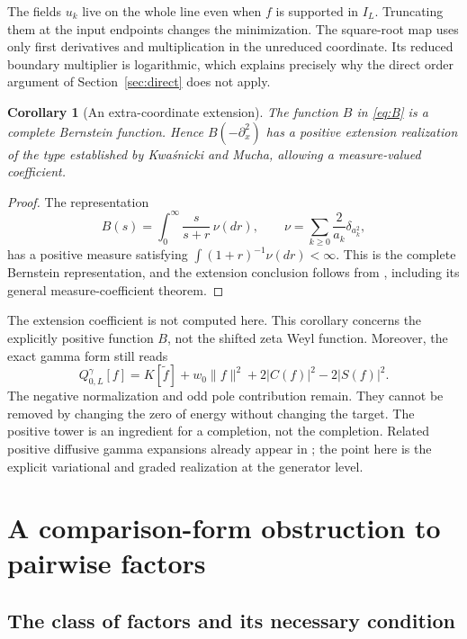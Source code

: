\documentclass[11pt]{article}
\numberwithin{equation}{section}
\newtheorem{corollary}[theorem]{Corollary}
\theoremstyle{definition}
\theoremstyle{remark}
\newcommand{\norm}[1]{\lVert#1\rVert}
\newcommand{\Qgam}{Q^{\gamma}}
\begin{document}
The fields $u_k$ live on the whole line even when $f$ is supported in
$I_L$. Truncating them at the input endpoints changes the minimization.
The square-root map uses only first derivatives and multiplication in the
unreduced coordinate. Its reduced boundary multiplier is logarithmic,
which explains precisely why the direct order argument of
Section~\ref{sec:direct} does not apply.

\begin{corollary}[An extra-coordinate extension]
The function $B$ in \eqref{eq:B} is a complete Bernstein function. Hence
$B(-\partial_x^2)$ has a positive extension realization of the type
established by Kwa\'snicki and Mucha, allowing a measure-valued coefficient.
\end{corollary}
\begin{proof}
The representation
\[
B(s)=\int_0^\infty\frac{s}{s+r}\,\nu(dr),
\qquad \nu=\sum_{k\geq0}\frac2{a_k}\delta_{a_k^2},
\]
has a positive measure satisfying
$\int(1+r)^{-1}\nu(dr)<\infty$. This is the complete Bernstein
representation, and the extension conclusion follows from
\cite{KwasnickiMucha}, including its general measure-coefficient theorem.
\end{proof}

The extension coefficient is not computed here. This corollary concerns
the explicitly positive function $B$, not the shifted zeta Weyl function.
Moreover, the exact gamma form still reads
\begin{equation}
\Qgam_{0,L}[f]=K[\widetilde f]+w_0\norm f^2
+2|C(f)|^2-2|S(f)|^2.
\label{eq:remaining}
\end{equation}
The negative normalization and odd pole contribution remain. They cannot
be removed by changing the zero of energy without changing the target.
The positive tower is an ingredient for a completion, not the completion.
Related positive diffusive gamma expansions already appear in
\cite{BakerFirst}; the point here is the explicit variational and graded
realization at the generator level.

\section{A comparison-form obstruction to pairwise factors}
\label{sec:comparison}

\subsection{The class of factors and its necessary condition}
\end{document}

